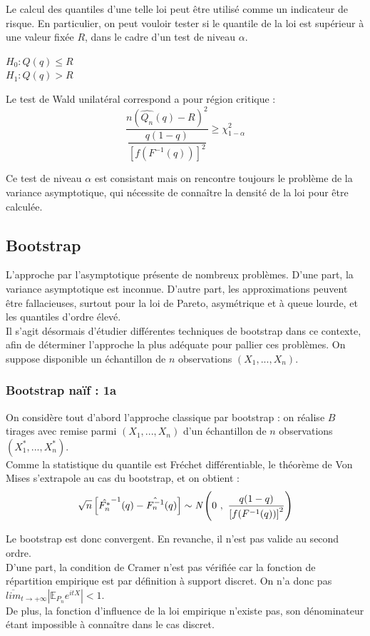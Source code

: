 \documentclass{article}
\renewcommand*{\(}{ \left( }
\renewcommand*{\)}{ \right) }
\begin{document}
Le calcul des quantiles d'une telle loi peut être utilisé comme un indicateur de risque. En particulier, on peut vouloir tester si le quantile de la loi est supérieur à une valeur fixée $R$, dans le cadre d'un test de niveau $\alpha$.\\
\begin{center}
$H_0 : Q(q) \leq R$\\
$H_1 : Q(q) > R$\\
\end{center}
Le test de Wald unilatéral correspond a pour région critique :  \\

\[\frac{n(\hat{Q_n}(q)-R)^2}{\dfrac{q(1-q)}{[f(F^{-1}(q))]^2}} \geq \chi^2_{1-\alpha}\]

Ce test de niveau $\alpha$ est consistant mais on rencontre toujours le problème de la variance asymptotique, qui nécessite de connaître la densité de la loi pour être calculée.

\subsection{Bootstrap}
L'approche par l'asymptotique présente de nombreux problèmes.
D'une part, la variance asymptotique est inconnue. D'autre part, les approximations peuvent être fallacieuses, surtout pour la loi de Pareto, asymétrique et à queue lourde, et les quantiles d'ordre élevé.\\

Il s'agit désormais d'étudier différentes techniques de bootstrap dans ce contexte, afin de déterminer l'approche la plus adéquate pour pallier ces problèmes. On suppose disponible un échantillon de $n$ observations $(X_1, ..., X_n)$.

\subsubsection{Bootstrap naïf : 1a}
On considère tout d'abord l'approche classique par bootstrap : on réalise $B$ tirages avec remise parmi $(X_1, ..., X_n)$ d'un échantillon de $n$ observations $(X^*_1, ..., X^*_n)$.\\

Comme la statistique du quantile est Fréchet différentiable, le théorème de Von Mises s'extrapole au cas du bootstrap, et on obtient :
\[
\sqrt{n}\left[ \hat{F_n^*}^{-1}(q)-\hat{F_n^{-1}}(q) \right] \sim \emph{N} \( 0 ~ , ~ \frac{q(1-q)}{\left[f(F^{-1}(q))\right]^2}\)
\]

Le bootstrap est donc convergent. En revanche, il n'est pas valide au second ordre. \\
D'une part, la condition de Cramer n'est pas vérifiée car la fonction de répartition empirique est par définition à support discret. On n'a donc pas $\overline{lim}_{t\rightarrow+\infty}|\mathbb{E}_{P_n}e^{itX}|<1$.\\
De plus, la fonction d'influence de la loi empirique n'existe pas, son dénominateur étant impossible à connaître dans le cas discret.\\
\end{document}
